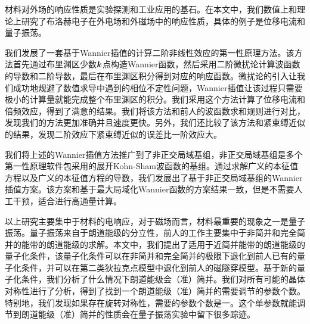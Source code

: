 \begin{cabstract}
  材料对外场的响应性质是实验探测和工业应用的基石。在本文中，我们数值上和理论上研究了布洛赫电子在外电场和外磁场中的响应性质，具体的例子是位移电流和量子振荡。

  我们发展了一套基于Wannier插值的计算二阶非线性效应的第一性原理方法。该方法首先通过布里渊区少数$\boldsymbol{k}$点构造Wannier函数，然后采用二阶微扰论计算波函数的导数和二阶导数，最后在布里渊区积分得到对应的响应函数。微扰论的引入让我们成功地规避了数值求导中遇到的相位不定性问题，Wannier插值让该过程只需要极小的计算量就能完成整个布里渊区的积分。我们采用这个方法计算了位移电流和倍频效应，得到了满意的结果。我们将该方法和前人的波函数求和规则进行对比，发现我们的方法更加准确并且速度更快。另外，我们还比较了该方法和紧束缚近似的结果，发现二阶效应下紧束缚近似的误差比一阶效应大。

  我们将上述的Wannier插值方法推广到了非正交局域基组，非正交局域基组是多个第一性原理软件包采用的展开Kohn-Sham波函数的基组。通过求解广义的本征值方程以及广义的本征值方程的导数，我们发展出了基于非正交局域基组的Wannier插值方案。该方案和基于最大局域化Wannier函数的方案结果一致，但是不需要人工干预，适合进行高通量计算。

  以上研究主要集中于材料的电响应，对于磁场而言，材料最重要的现象之一是量子振荡。量子振荡来自于朗道能级的分立性，前人的工作主要集中于非简并和完全简并的能带的朗道能级的求解。本文中，我们提出了适用于近简并能带的朗道能级的量子化条件，该量子化条件可以在非简并和完全简并的极限下退化到前人已有的量子化条件，并可以在第二类狄拉克点模型中退化到前人的磁隧穿模型。基于新的量子化条件，我们分析了什么情况下朗道能级会（准）简并。我们对所有可能的晶体对称性进行了分析，得到了找到一个朗道能级（准）简并的需要调节的参数个数。特别地，我们发现如果存在旋转对称性，需要的参数个数是一。这个单参数就能调节到朗道能级（准）简并的性质会在量子振荡实验中留下很多踪迹。
\end{cabstract}


